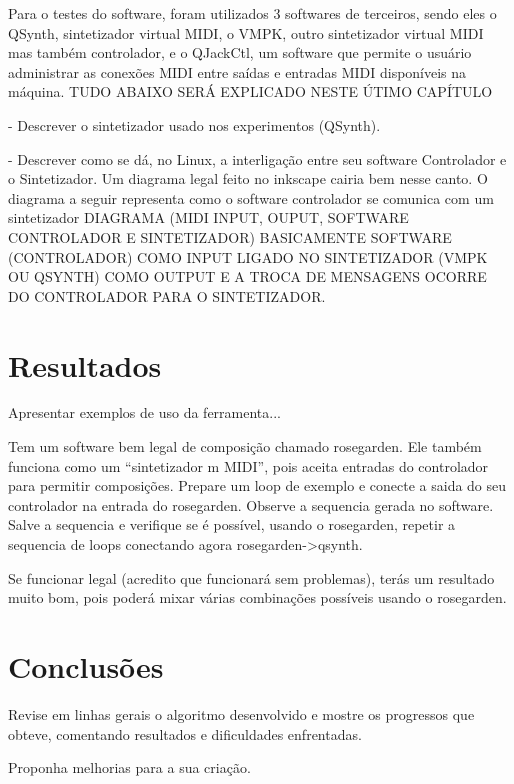 \documentclass[12pt]{report}
\begin{document}
Para o testes do software, foram utilizados 3 softwares de terceiros, sendo eles o QSynth, sintetizador virtual MIDI, o VMPK, outro sintetizador virtual MIDI mas também controlador, e o QJackCtl, um software que permite o usuário administrar as conexões MIDI entre saídas e entradas MIDI disponíveis na máquina.
TUDO ABAIXO SERÁ EXPLICADO NESTE ÚTIMO CAPÍTULO

- Descrever o sintetizador usado nos experimentos (QSynth).

- Descrever como se dá, no Linux, a interligação entre seu software
Controlador e o Sintetizador. Um diagrama legal feito no inkscape
cairia bem nesse canto.
O diagrama a seguir representa como o software controlador se comunica com um sintetizador
DIAGRAMA (MIDI INPUT, OUPUT, SOFTWARE CONTROLADOR E SINTETIZADOR)
BASICAMENTE SOFTWARE (CONTROLADOR) COMO INPUT LIGADO NO SINTETIZADOR (VMPK OU QSYNTH) COMO OUTPUT E A TROCA DE MENSAGENS OCORRE DO CONTROLADOR PARA O SINTETIZADOR.

\chapter{Resultados}
\label{cha:resultados}

Apresentar exemplos de uso da ferramenta...

Tem um software bem legal de composição chamado rosegarden. Ele também
funciona como um ``sintetizador m MIDI'', pois aceita entradas do
controlador para permitir composições. Prepare um loop de exemplo e
conecte a saida do seu controlador na entrada do rosegarden. Observe a
sequencia gerada no software. Salve a sequencia e verifique se é
possível, usando o rosegarden, repetir a sequencia de loops conectando
agora rosegarden->qsynth.

Se funcionar legal (acredito que funcionará sem problemas), terás um
resultado muito bom, pois poderá mixar várias combinações possíveis
usando o rosegarden.

\chapter{Conclusões}
\label{cha:conclusoes}

Revise em linhas gerais o algoritmo desenvolvido e mostre os
progressos que obteve, comentando resultados e dificuldades
enfrentadas.

Proponha melhorias para a sua criação.


\end{document}

